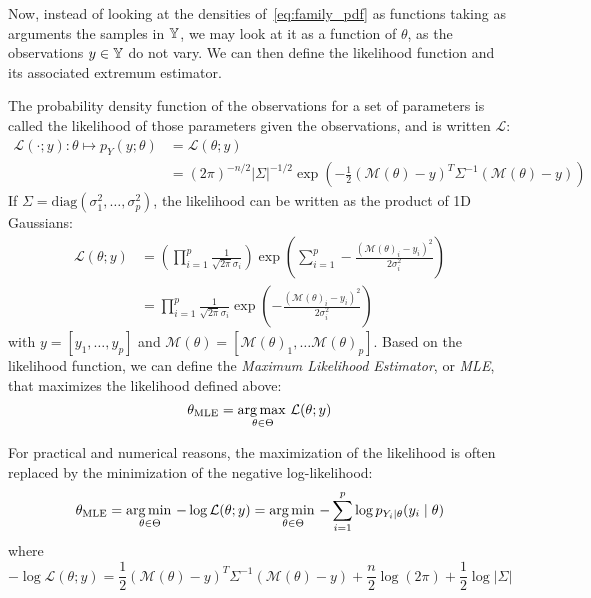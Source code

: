 \documentclass[../../Main_ManuscritThese.tex]{subfiles}
\begin{document}
Now, instead of looking at the densities of~\cref{eq:family_pdf} as functions taking as arguments the samples in $\mathbb{Y}$, we may look at it as a function of $\theta$, as the observations $y\in\mathbb{Y}$ do not vary. We can then define the likelihood function and its associated extremum estimator.
\begin{definition}
  \label{def:mle}
  The probability density function of the observations for a set of parameters is called the likelihood of those parameters given the observations, and is written $\mathcal{L}$:
  \begin{align}
    \label{eq:likelihood_definition}
    \mathcal{L}(\cdot ;y): \theta \mapsto p_{Y}(y;\theta) &= \mathcal{L}(\theta;y) \\
    &=(2\pi)^{-n/2}\lvert \Sigma \rvert^{-1/2}\exp\left(-\frac{1}{2}(\mathcal{M}(\theta) - y)^T\Sigma^{-1}(\mathcal{M}(\theta) - y)\right)
  \end{align}
  If $\Sigma = \mathrm{diag}(\sigma^2_1,\dots, \sigma^2_p)$, the likelihood can be written as the product of 1D Gaussians: 
  \begin{align}
    \mathcal{L}(\theta;y) &= \left(\prod_{i=1}^p\frac{1}{\sqrt{2\pi}\sigma_i}\right)\exp\left(\sum_{i=1}^p -\frac{(\mathcal{M}(\theta)_i - y_i)^2}{2\sigma^2_i}\right) \\
                          &= \prod_{i=1}^p\frac{1}{\sqrt{2\pi}\sigma_i}\exp\left(-\frac{(\mathcal{M}(\theta)_i - y_i)^2}{2\sigma^2_i}\right)
  \end{align}
  with $y = [y_1, \dots, y_p]$ and $\mathcal{M}(\theta) = [\mathcal{M}(\theta)_1,\dots \mathcal{M}(\theta)_p]$.
  Based on the likelihood function, we can define the \emph{Maximum Likelihood Estimator}, or \emph{MLE}, that maximizes the likelihood defined above:
  \begin{equation}
    \label{eq:def_MLE}
    {\theta}_{\mathrm{MLE}} = \operatorname*{arg\,max \,}_{\theta\in\Theta}\mathcal{L}(\theta;y)
  \end{equation}

\end{definition}
  For practical and numerical reasons, the maximization of the likelihood is often replaced by the minimization of the negative log-likelihood:
  \begin{equation}
    \label{eq:MLE_iid}
    {\theta}_{\mathrm{MLE}} = \operatorname*{arg\,min \,}_{\theta \in \Theta} -\log \mathcal{L}(\theta;y)= \operatorname*{arg\,min \,}_{\theta \in \Theta} -\sum_{i=1}^p\log p_{Y_i\mid \theta}(y_i \mid \theta) 
  \end{equation} 
  where
  \begin{equation}
    -\log\mathcal{L}(\theta;y) = \frac{1}{2}(\mathcal{M}(\theta) - y)^T\Sigma^{-1}(\mathcal{M}(\theta) - y)+  \frac{n}{2}\log(2\pi) + \frac{1}{2}\log\lvert \Sigma \rvert
  \end{equation}
\end{document}

